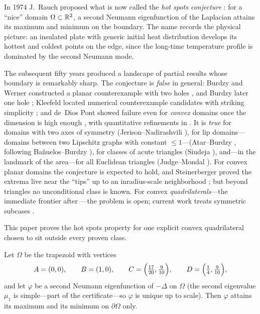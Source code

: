 \documentclass[11pt]{article}
\begin{document}
In 1974 J.~Rauch proposed what is now called the \emph{hot spots
conjecture} \cite{Rauch}: for a ``nice'' domain $\Omega\subset\mathbb{R}^2$, a
second Neumann eigenfunction of the Laplacian attains its maximum and
minimum on the boundary. The name records the physical picture: an
insulated plate with generic initial heat distribution develops its
hottest and coldest points on the edge, since the long-time temperature
profile is dominated by the second Neumann mode.

The subsequent fifty years produced a landscape of partial results whose
boundary is remarkably sharp. The conjecture is \emph{false} in general:
Burdzy and Werner constructed a planar counterexample with two holes
\cite{BurdzyWerner}, and Burdzy later one hole \cite{Burdzy2005};
Kleefeld located numerical counterexample candidates with striking
simplicity \cite{Kleefeld}; and de~Dios Pont showed failure even for
\emph{convex} domains once the dimension is high enough \cite{dDP}, with
quantitative refinements in \cite{dDPHT}. It is \emph{true} for domains
with two axes of symmetry (Jerison--Nadirashvili \cite{JerisonNadirashvili}),
for lip domains---domains between two Lipschitz graphs with constant
$\le 1$---(Atar--Burdzy \cite{AtarBurdzy}, following
Ba\~nuelos--Burdzy \cite{BanuelosBurdzy}), for classes of acute triangles
(Siudeja \cite{Siudeja}), and---in the landmark of the area---for all
Euclidean triangles (Judge--Mondal \cite{JudgeMondal}). For convex
planar domains the conjecture is expected to hold, and Steinerberger
proved the extrema live near the ``tips'' up to an inradius-scale
neighborhood \cite{Steinerberger}; but beyond triangles no unconditional
class is known. For convex \emph{quadrilaterals}---the immediate
frontier after \cite{JudgeMondal}---the problem is open; current work
treats symmetric subcases \cite{SymQuad}.

This paper proves the hot spots property for one explicit convex
quadrilateral chosen to sit outside every proven class.

\begin{theorem}\label{thm:main}
Let $\Omega$ be the trapezoid with vertices
\[
A=(0,0),\qquad B=(1,0),\qquad C=\Bigl(\tfrac{17}{20},\tfrac{9}{10}\Bigr),
\qquad D=\Bigl(\tfrac14,\tfrac{9}{10}\Bigr),
\]
and let $\varphi$ be a second Neumann eigenfunction of $-\Delta$ on
$\Omega$ (the second eigenvalue $\mu_1$ is simple---part of the
certificate---so $\varphi$ is unique up to scale). Then $\varphi$
attains its maximum and its minimum on $\partial\Omega$ only.
\end{theorem}
\end{document}

